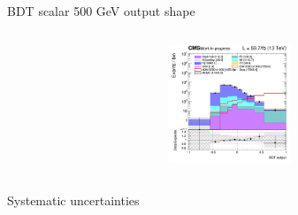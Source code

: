 \documentclass[8pt]{beamer}
\begin{document}
\begin{frame}{BDT scalar 500 GeV output shape}
\begin{columns}
\begin{column}{0.33\textwidth}
\begin{center}
     			\includegraphics[width=1.0\textwidth, height=100pt]{figs/2018/SmearSR-ttDM-scalar500/log_cratio_topCR_ll_TTbar_BDT_output_scalar500_customBinsAttempt7.png}
    		\end{center}		
		\end{column}
\end{columns} \vfill
\end{frame}















\begin{frame}[standout]
Systematic uncertainties
\end{frame}
\end{document}
